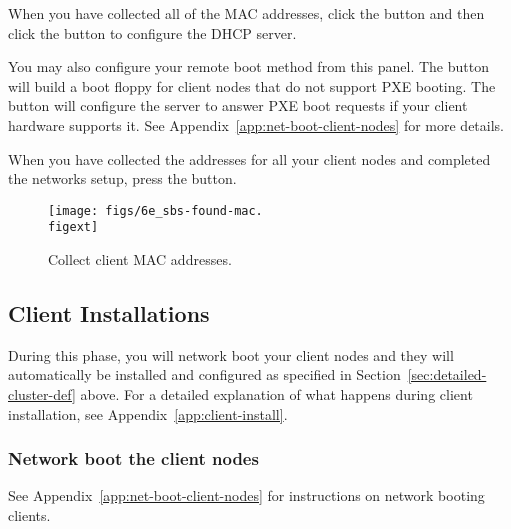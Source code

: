 When you have collected all of the MAC addresses, click the
 button and then click the  button to configure the DHCP server.
 
You may also configure your remote boot method from this panel. The
 button will build a boot floppy for
client nodes that do not support PXE booting. The  button will configure the server to answer PXE boot
requests if your client hardware supports it. See
Appendix~\ref{app:net-boot-client-nodes} for more details.  

When you have collected the addresses for all your client nodes and
completed the networks setup, press the  button.

\begin{figure}[htbp]
  \begin{center}
    \texttt{[image: figs/6e\_sbs-found-mac.\\figext]}
    \caption{Collect client MAC addresses.}
    \label{fig:detailed-collect-mac}
  \end{center}
\end{figure}


\subsection{Client Installations}
\label{det:clientinstall}

During this phase, you will network boot your client nodes and they
will automatically be installed and configured as specified in
Section~\ref{sec:detailed-cluster-def} above. For a detailed
explanation of what happens during client installation, see
Appendix~\ref{app:client-install}.


\subsubsection{Network boot the client nodes}

See Appendix~\ref{app:net-boot-client-nodes} for instructions on
network booting clients.


